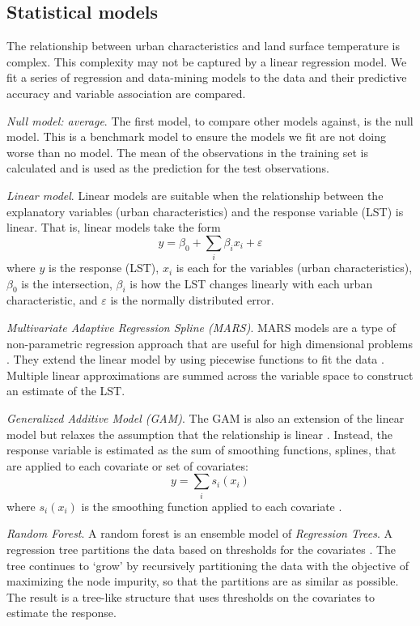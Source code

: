 \documentclass[final,3p,times,twocolumn,sort&compress]{elsarticle}
\begin{document}
\subsection{Statistical models}
\label{ss:models}
The relationship between urban characteristics and land surface temperature is complex.
This complexity may not be captured by a linear regression model. 
We fit a series of regression and data-mining models to the data and their predictive accuracy and variable association are compared.

\textit{Null model: average}. The first model, to compare other models against, is the null model. 
This is a benchmark model to ensure the models we fit are not doing worse than no model.
The mean of the observations in the training set is calculated and is used as the prediction for the test observations.

\textit{Linear model}. Linear models are suitable when the relationship between the explanatory variables (urban characteristics) and the response variable (LST) is linear. 
That is, linear models take the form $$ y = \beta_0 + \sum_i \beta_i x_i + \varepsilon$$ where $y$ is the response (LST), $x_i$ is each for the variables (urban characteristics), $\beta_0$ is the intersection, $\beta_i$ is how the LST changes linearly with each urban characteristic, and $\varepsilon$ is the normally distributed error.

\textit{Multivariate Adaptive Regression Spline (MARS)}. 
MARS models are a type of non-parametric regression approach that are useful for high dimensional problems \cite{Hastie2009-ky}. 
They extend the linear model by using piecewise functions to fit the data \cite{Friedman1991-of}. 
Multiple linear approximations are summed across the variable space to construct an estimate of the  LST\cite{Friedman1991-of}. 

\textit{Generalized Additive Model (GAM)}. 
The GAM is also an extension of the linear model but relaxes the assumption that the relationship is linear \cite{Hastie1990-cg}.
Instead, the response variable is estimated as the sum of smoothing functions, splines, that are applied to each covariate or set of covariates: $$ y = \sum_i s_i(x_i)$$ where $s_i(x_i)$ is the smoothing function applied to each covariate \cite{Shortridge2015-ub}.

\textit{Random Forest}. A random forest is an ensemble model of \textit{Regression Trees}. 
A regression tree partitions the data based on thresholds for the covariates \cite{Breiman1984-hw}. 
The tree continues to `grow' by recursively partitioning the data with the objective of maximizing the node impurity, so that the partitions are as similar as possible. 
The result is a tree-like structure that uses thresholds on the covariates to estimate the response.
\end{document}
